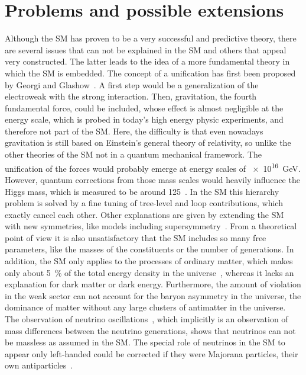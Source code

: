 
\section{Problems and possible extensions}
\label{sec:standardmodel:extensions}

Although the SM has proven to be a very successful and predictive theory,
there are several issues that can not be explained in the SM and others that
appeal very constructed. The latter leads to the idea of a more fundamental
theory in which the SM is embedded. The concept of a unification has first
been proposed by Georgi and Glashow~\cite{Georgi:1974sy}. A first step would
be a generalization of the electroweak with the strong interaction. Then,
gravitation, the fourth fundamental force, could be included, whose effect is
almost negligible at the energy scale, which is probed in today's high energy
physic experiments, and therefore not part of the SM. Here, the difficulty is
that even nowadays gravitation is still based on Einstein's general theory of
relativity, so unlike the other theories of the SM not in a quantum mechanical
framework. The unification of the forces would probably emerge at energy
scales of \SI{e16}{\GeV}. However, quantum corrections from those mass scales
would heavily influence the Higgs mass, which is measured to be around
\SI{125}{\GeVcc}~\cite{HiggsMass}. In the SM this hierarchy problem is
solved by a fine tuning of tree-level and loop contributions, which exactly
cancel each other. Other explanations are given by extending the SM with new
symmetries, like models including
supersymmetry~\cite{Gervais:1971ji,Golfand:1971iw,Volkov:1972jx,*Volkov:1973ix}.
From a theoretical point of view it is also unsatisfactory that the SM
includes so many free parameters, like the masses of the constituents or the
number of generations. In addition, the SM only applies to the processes of
ordinary matter, which makes only about \SI{5}{\percent} of the total energy
density in the universe~\cite{Ade:2015xua}, whereas it lacks an explanation
for dark matter or dark energy. Furthermore, the amount of \CP violation in
the weak sector can not account for the baryon asymmetry in the universe, \ie
the dominance of matter without any large clusters of antimatter in the
universe. The observation of neutrino
oscillations~\cite{Fukuda:1998mi,Ahmad:2001an,*Ahmad:2002jz}, which implicitly
is an observation of mass differences between the neutrino generations, shows
that neutrinos can not be massless as assumed in the SM. The special role of
neutrinos in the SM to appear only left-handed could be corrected if they were
Majorana particles, \ie their own antiparticles~\cite{Majorana:1937vz}.
